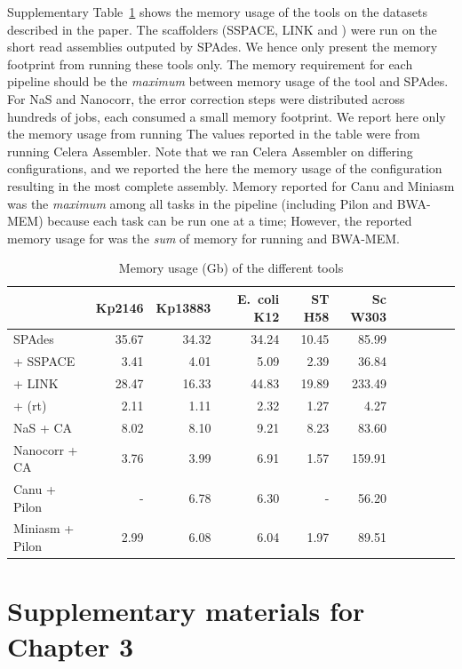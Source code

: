 Supplementary Table~\ref{T:mem} shows the memory usage of the tools on
the datasets described in the paper. The scaffolders (SSPACE, LINK and
\npscarf{}) were run on the short read assemblies outputed by SPAdes. We hence
only present the memory footprint from running these tools only. The memory
requirement for each pipeline should be the \emph{maximum} between memory usage
of the tool and SPAdes. For NaS and Nanocorr, the error correction steps were
distributed across hundreds of jobs, each consumed a small memory footprint. We
report here only the memory usage from running  The values reported in the table
were from running Celera Assembler. Note that we ran Celera Assembler on
differing configurations, and we reported the here the memory usage of the
configuration resulting in the most complete assembly.
Memory reported for Canu and Miniasm was the \emph{maximum} among all tasks
in the pipeline (including Pilon and BWA-MEM) because each task can be run one
at a time; However, the reported memory usage for \npscarf{} was the \emph{sum} of 
memory for running \npscarf{} and BWA-MEM.
\begin{table}[!hpt]
\centering
\caption{Memory usage (Gb) of the different tools}
\label{T:mem}
\begin{tabular}{lrrrrrrrrrr}
\hline
\toprule
 & \textbf{Kp2146} & \textbf{Kp13883} & \textbf{E.~coli K12} & \textbf{ST H58} & \textbf{Sc W303}\\
\hline
SPAdes & 35.67 & 34.32 & 34.24 & 10.45 & 85.99 \\
 + SSPACE & 3.41 & 4.01 & 5.09 & 2.39 & 36.84 \\
 + LINK & 28.47 & 16.33 & 44.83 & 19.89 & 233.49 \\
 + \npscarf{}{} (rt) & 2.11 & 1.11 & 2.32 & 1.27 & 4.27\\
NaS + CA & 8.02 & 8.10 & 9.21 & 8.23 & 83.60 \\
Nanocorr + CA & 3.76 & 3.99 & 6.91 & 1.57 & 159.91 \\
Canu + Pilon & - & 6.78 & 6.30 & - & 56.20 \\
Miniasm + Pilon & 2.99 & 6.08 & 6.04 & 1.97 & 89.51 \\
\hline
\end{tabular}
\end{table}

\chapter{Supplementary materials for Chapter 3}\label{app:npbarcode}
\newpage

